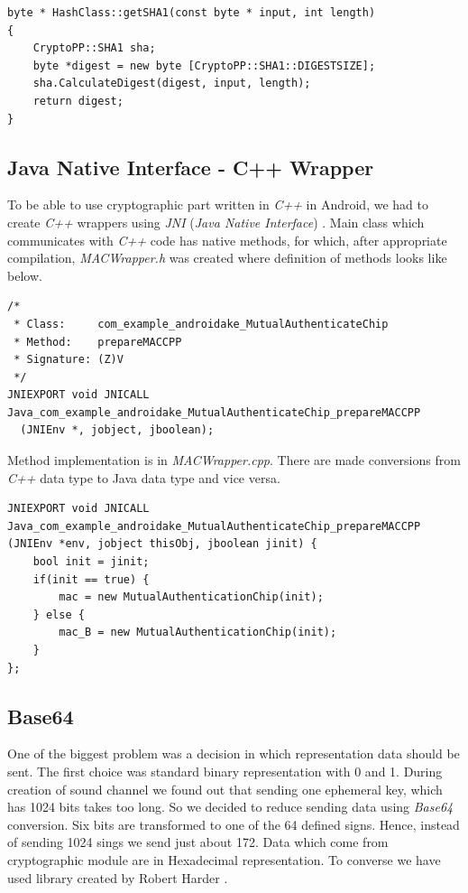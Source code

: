 \documentclass[11pt,titlepage]{article}
\theoremstyle{plain}
\begin{document}
\begin{lstlisting}
byte * HashClass::getSHA1(const byte * input, int length)
{
	CryptoPP::SHA1 sha;
	byte *digest = new byte [CryptoPP::SHA1::DIGESTSIZE];
	sha.CalculateDigest(digest, input, length);
	return digest;
}
\end{lstlisting}

\subsection{Java Native Interface - C++ Wrapper}

To be able to use cryptographic part written in \textit{C++} in Android, we had to create \textit{C++} wrappers using \textit{JNI} (\textit{Java Native Interface}) \cite{JNI}. Main class which communicates with \textit{C++} code has native methods, for which, after appropriate compilation,  \textit{MACWrapper.h} was created where definition of methods looks like below.

\begin{lstlisting}
/*
 * Class:     com_example_androidake_MutualAuthenticateChip
 * Method:    prepareMACCPP
 * Signature: (Z)V
 */
JNIEXPORT void JNICALL Java_com_example_androidake_MutualAuthenticateChip_prepareMACCPP
  (JNIEnv *, jobject, jboolean);
\end{lstlisting}

Method implementation is in \textit{MACWrapper.cpp}. There are made conversions from \textit{C++} data type to Java data type and vice versa.

\begin{lstlisting}
JNIEXPORT void JNICALL Java_com_example_androidake_MutualAuthenticateChip_prepareMACCPP
(JNIEnv *env, jobject thisObj, jboolean jinit) {
	bool init = jinit;
	if(init == true) {
		mac = new MutualAuthenticationChip(init);
	} else {
		mac_B = new MutualAuthenticationChip(init);
	}
};
\end{lstlisting}

\subsection{Base64}

One of the biggest problem was a decision in which representation data should be sent. The first choice was standard binary representation with 0 and 1. During creation of sound channel we found out that sending one ephemeral key, which has 1024 bits takes too long. So we decided to reduce sending data using \textit{Base64} conversion. Six bits are transformed to one of the 64 defined signs. Hence, instead of sending 1024 sings we send just about 172. Data which come from cryptographic module are in Hexadecimal representation. To converse we have used library created by Robert Harder \cite{base_64}. 
\end{document}
